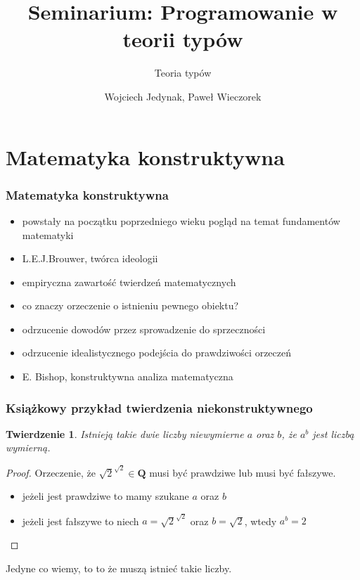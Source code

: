 \documentclass{beamer}
\title{Seminarium: Programowanie w teorii typów}
\subtitle{Teoria typów}
\author{Wojciech Jedynak, Paweł Wieczorek}
\institute{Instytut Informatyki Uniwersytetu Wrocławskiego}
\newtheorem{thm}{Twierdzenie}
\begin{document}

\maketitle



\section{Matematyka konstruktywna}

\begin{frame}
\frametitle{Matematyka konstruktywna}

\begin{itemize}
 \item powstały na początku poprzedniego wieku pogląd na temat fundamentów matematyki
 \item L.E.J.Brouwer, twórca ideologii
 \item empiryczna zawartość twierdzeń matematycznych
 \item co znaczy orzeczenie o istnieniu pewnego obiektu?
 \item odrzucenie dowodów przez sprowadzenie do sprzeczności
 \item odrzucenie idealistycznego podejścia do prawdziwości orzeczeń
 \item E. Bishop, konstruktywna analiza matematyczna
\end{itemize}


\end{frame}


\begin{frame}
\frametitle{Książkowy przykład twierdzenia niekonstruktywnego}

\begin{thm}
 Istnieją takie dwie liczby niewymierne $a$ oraz $b$, że $a^b$ jest liczbą wymierną.
\end{thm}

\begin{proof}
 Orzeczenie, że $\sqrt{2}^{\sqrt{2}} \in \mathbf{Q}$ musi być prawdziwe lub musi być fałszywe.
\begin{itemize}
 \item jeżeli jest prawdziwe to mamy szukane $a$ oraz $b$
 \item jeżeli jest fałszywe to niech $a = \sqrt{2}^{\sqrt{2}}$ oraz $b = \sqrt{2}$, wtedy $a^b = 2$
\end{itemize}

\end{proof}

Jedyne co wiemy, to to że muszą istnieć takie liczby. 

\end{frame}
\end{document}
